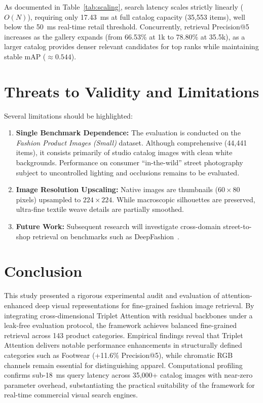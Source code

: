 \documentclass[runningheads]{llncs}
\begin{document}
As documented in Table~\ref{tab:scaling}, search latency scales strictly linearly ($O(N)$), requiring only 17.43~ms at full catalog capacity (35,553 items), well below the 50~ms real-time retail threshold. Concurrently, retrieval Precision@5 increases as the gallery expands (from 66.53\% at 1k to 78.80\% at 35.5k), as a larger catalog provides denser relevant candidates for top ranks while maintaining stable mAP ($\approx 0.544$).

\section{Threats to Validity and Limitations}
Several limitations should be highlighted:
\begin{enumerate}
    \item \textbf{Single Benchmark Dependence:} The evaluation is conducted on the \textit{Fashion Product Images (Small)} dataset. Although comprehensive (44,441 items), it consists primarily of studio catalog images with clean white backgrounds. Performance on consumer ``in-the-wild'' street photography subject to uncontrolled lighting and occlusions remains to be evaluated.
    \item \textbf{Image Resolution Upscaling:} Native images are thumbnails ($60 \times 80$ pixels) upsampled to $224 \times 224$. While macroscopic silhouettes are preserved, ultra-fine textile weave details are partially smoothed.
    \item \textbf{Future Work:} Subsequent research will investigate cross-domain street-to-shop retrieval on benchmarks such as DeepFashion~\cite{liu2016deepfashion}.
\end{enumerate}

\section{Conclusion}
This study presented a rigorous experimental audit and evaluation of attention-enhanced deep visual representations for fine-grained fashion image retrieval. By integrating cross-dimensional Triplet Attention with residual backbones under a leak-free evaluation protocol, the framework achieves balanced fine-grained retrieval across 143 product categories. Empirical findings reveal that Triplet Attention delivers notable performance enhancements in structurally defined categories such as Footwear (+11.6\% Precision@5), while chromatic RGB channels remain essential for distinguishing apparel. Computational profiling confirms sub-18~ms query latency across 35,000+ catalog images with near-zero parameter overhead, substantiating the practical suitability of the framework for real-time commercial visual search engines.
\end{document}
